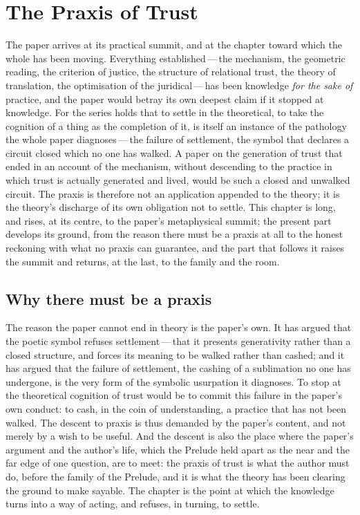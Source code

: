 \section{The Praxis of Trust}
\label{p13:sec:praxis}

\noindent
The paper arrives at its practical summit, and at the chapter toward which the whole has been moving. Everything established\,---\,the mechanism, the geometric reading, the criterion of justice, the structure of relational trust, the theory of translation, the optimisation of the juridical\,---\,has been knowledge \emph{for the sake of} practice, and the paper would betray its own deepest claim if it stopped at knowledge. For the series holds that to settle in the theoretical, to take the cognition of a thing as the completion of it, is itself an instance of the pathology the whole paper diagnoses\,---\,the failure of settlement, the symbol that declares a circuit closed which no one has walked. A paper on the generation of trust that ended in an account of the mechanism, without descending to the practice in which trust is actually generated and lived, would be such a closed and unwalked circuit. The praxis is therefore not an application appended to the theory; it is the theory's discharge of its own obligation not to settle. This chapter is long, and rises, at its centre, to the paper's metaphysical summit; the present part develops its ground, from the reason there must be a praxis at all to the honest reckoning with what no praxis can guarantee, and the part that follows it raises the summit and returns, at the last, to the family and the room.

\subsection{Why there must be a praxis}
\label{p13:sub:prax-why}

The reason the paper cannot end in theory is the paper's own. It has argued that the poetic symbol refuses settlement\,---\,that it presents generativity rather than a closed structure, and forces its meaning to be walked rather than cashed; and it has argued that the failure of settlement, the cashing of a sublimation no one has undergone, is the very form of the symbolic usurpation it diagnoses. To stop at the theoretical cognition of trust would be to commit this failure in the paper's own conduct: to cash, in the coin of understanding, a practice that has not been walked. The descent to praxis is thus demanded by the paper's content, and not merely by a wish to be useful. And the descent is also the place where the paper's argument and the author's life, which the Prelude held apart as the near and the far edge of one question, are to meet: the praxis of trust is what the author must do, before the family of the Prelude, and it is what the theory has been clearing the ground to make sayable. The chapter is the point at which the knowledge turns into a way of acting, and refuses, in turning, to settle.

